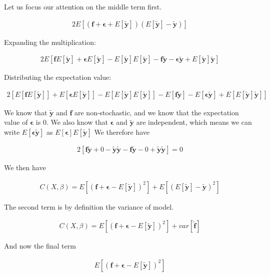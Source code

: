 \documentclass[twocolumn,10pt,cleanfoot]{asme2ej}
\begin{document}
Let us focus our attention on the middle term first.

\begin{gather}
2E\left[(\bm{f} + \bm{\epsilon} + E[\bm{\tilde{y}}])(E[\bm{\tilde{y}}] - \bm{\tilde{y}})\right] 
\end{gather}

Expanding the multiplication:

\begin{gather}
2E\left[\bm{f}E[\bm{\tilde{y}}] + \bm{\epsilon}E[\bm{\tilde{y}}] - E[\bm{\tilde{y}}]E[\bm{\tilde{y}}] - \bm{f}\bm{\tilde{y}} - \bm{\epsilon}\bm{\tilde{y}} + E[\bm{\tilde{y}}]\bm{\tilde{y}}\right] 
\end{gather}

Distributing the expectation value:

\begin{gather}
2\left[E[\bm{f}E[\bm{\tilde{y}}]] + E[\bm{\epsilon}E[\bm{\tilde{y}}]] - E[E[\bm{\tilde{y}}]E[\bm{\tilde{y}}]] - E[\bm{f}\bm{\tilde{y}}] - E[\bm{\epsilon}\bm{\tilde{y}}] + E[E[\bm{\tilde{y}}]\bm{\tilde{y}}]\right] 
\end{gather}

We know that $\bm{\tilde{y}}$ and $\bm{f}$ are non-stochastic, and we know that the expectation value of $\bm{\epsilon}$ is $0$. We also know that 
$\bm{\epsilon}$ and $\bm{\tilde{y}}$ are independent, which means we can write $E[\bm{\epsilon}\bm{\tilde{y}}]$ as $E[\bm{\epsilon}]E[\bm{\tilde{y}}]$ We therefore have

\begin{gather}
2\left[\bm{f}\bm{\tilde{y}} + 0 - \bm{\tilde{y}}\bm{\tilde{y}} - \bm{f}\bm{\tilde{y}} - 0 + \bm{\tilde{y}}\bm{\tilde{y}}\right] = 0 
\end{gather}

We then have

\begin{gather}
C(X,\beta) = E\left[(\bm{f} + \bm{\epsilon} - E[\bm{\tilde{y}}])^2\right] + E\left[(E[\bm{\tilde{y}}] - \bm{\tilde{y}})^2\right] 
\end{gather}

The second term is by definition the variance of model.

\begin{gather}
C(X,\beta) = E\left[(\bm{f} + \bm{\epsilon} - E[\bm{\tilde{y}}])^2\right] + var[\bm{\tilde{f}}] 
\end{gather}

And now the final term

\begin{gather}
E\left[(\bm{f} + \bm{\epsilon} - E[\bm{\tilde{y}}])^2\right]
\end{gather}
\end{document}
